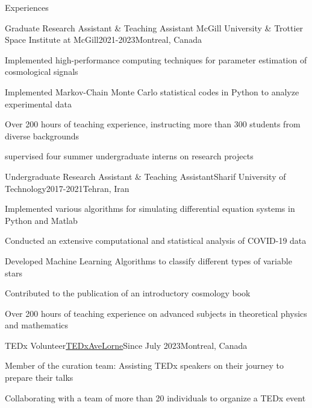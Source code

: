 \documentclass[]{kyvernitis-resume}
\begin{document}
\resumeheader
{}
{}
{}
{}

\midskip
\begin{section}{Experiences}
    \begin{subsection}
        {Graduate Research Assistant \& Teaching Assistant}
        {McGill University \& Trottier Space Institute at McGill}{2021-2023}{Montreal, Canada}
        
        \item Implemented high-performance computing techniques for parameter estimation of cosmological signals
        \item Implemented Markov-Chain Monte Carlo statistical codes in Python to analyze experimental data
        \item Over 200 hours of teaching experience, instructing more than 300 students from diverse backgrounds
        \item supervised four summer undergraduate interns on research projects
        
    \end{subsection}
    
    \begin{subsection}{Undergraduate Research Assistant \& Teaching Assistant}{Sharif University of Technology}{2017-2021}{Tehran, Iran}
    \item Implemented various algorithms for simulating differential equation systems in Python and Matlab 
    \item Conducted an extensive computational and statistical analysis of COVID-19 data 
    \item Developed Machine Learning Algorithms to classify different types of variable stars
    \item Contributed to the publication of an introductory cosmology book
    \item Over 200 hours of teaching experience on advanced subjects in theoretical physics and mathematics

    \end{subsection}   
    \begin{subsection}
        {TEDx Volunteer}{\href{https://www.ted.com/tedx/events/53037}{TEDxAveLorne}}{Since July 2023}{Montreal, Canada}
        \item Member of the curation team: Assisting TEDx speakers on their journey to prepare their talks 
        \item Collaborating with a team of more than 20 individuals to organize a TEDx event
    \end{subsection}


\end{section}
\end{document}
